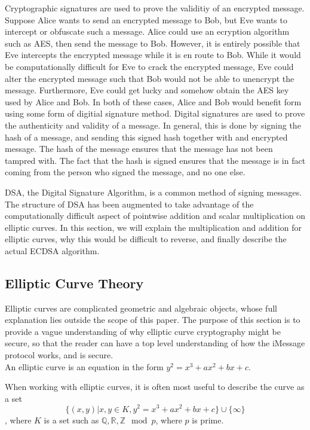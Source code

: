 Cryptographic signatures are used to prove the validitiy of an encrypted message.
Suppose Alice wants to send an encrypted message to Bob, but Eve wants to intercept
or obfuscate such a message.  Alice could use an ecryption algorithm such as AES,
then send the message to Bob.  However, it is entirely possible that Eve intercepts
the encrypted message while it is en route to Bob.  While it would be computationally
difficult for Eve to crack the encrypted message, Eve could alter the encrypted message
such that Bob would not be able to unencrypt the message. Furthermore, Eve could get lucky
and somehow obtain the AES key used by Alice and Bob. In both of these cases, Alice and Bob
would benefit form using some form of digitial signature method.  Digital signatures
are used to prove the authenticity and validity of a message.  In general, this is done by
signing the hash of a message, and sending this signed hash together with and encrypted message.
The hash of the message ensures that the message has not been
tampred with.  The fact that the hash is signed ensures that the message is in fact coming
from the person who signed the message, and no one else.

DSA, the Digital Signature Algorithm, is a common method of signing messages.
The structure of DSA has been augmented to take advantage of the
computationally difficult aspect of pointwise addition and scalar multiplication
on elliptic curves.  In this section, we will explain the multiplication
and addition for elliptic curves, why this would be difficult to reverse,
and finally describe the actual ECDSA algorithm.

\subsection{Elliptic Curve Theory}

Elliptic curves are complicated geometric and algebraic objects,
whose full explanation lies outside the scope of this paper.
The purpose of this section is to provide a vague understanding
of why elliptic curve cryptography might be secure, so that the reader
can have a top level understanding of how the iMessage protocol
works, and is secure.\\

An elliptic curve is an equation in the form $y^2 = x^3 + ax^2 + bx + c$.

When working with elliptic curves, it is often most useful to describe the curve as a set
$$\{(x,y) \vert x,y \in K, y^2 = x^3 + ax^2 + bx + c\} \cup \{ \infty \}$$, where $K$ is a set such as
$\mathbb{Q}, \mathbb{R}, \mathbb{Z} \mod p$, where $p$ is prime.

